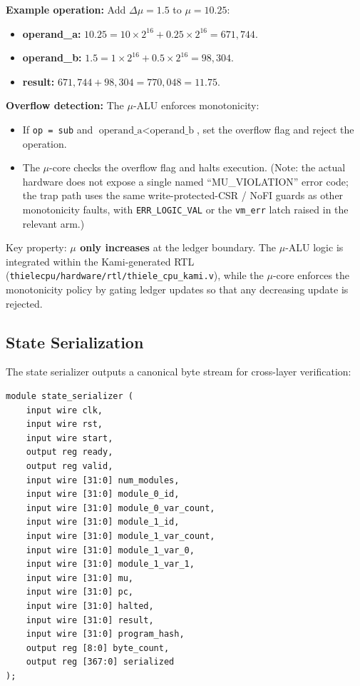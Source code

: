 \textbf{Example operation:} Add $\Delta\mu = 1.5$ to $\mu = 10.25$:
\begin{itemize}
    \item \textbf{operand\_a:} $10.25 = 10 \times 2^{16} + 0.25 \times 2^{16} = 671,744$.
    \item \textbf{operand\_b:} $1.5 = 1 \times 2^{16} + 0.5 \times 2^{16} = 98,304$.
    \item \textbf{result:} $671,744 + 98,304 = 770,048 = 11.75$.
\end{itemize}

\textbf{Overflow detection:} The $\mu$-ALU enforces monotonicity:
\begin{itemize}
    \item If \texttt{op = sub} and $\text{operand\_a} < \text{operand\_b}$, set the overflow flag and reject the operation.
    \item The $\mu$-core checks the overflow flag and halts execution. (Note: the actual hardware does not expose a single named ``MU\_VIOLATION'' error code; the trap path uses the same write-protected-CSR / NoFI guards as other monotonicity faults, with \texttt{ERR\_LOGIC\_VAL} or the \texttt{vm\_err} latch raised in the relevant arm.)
\end{itemize}


Key property: \textbf{$\mu$ only increases} at the ledger boundary. The $\mu$-ALU logic is integrated within the Kami-generated RTL (\texttt{thielecpu/hardware/rtl/thiele\_cpu\_kami.v}), while the $\mu$-core enforces the monotonicity policy by gating ledger updates so that any decreasing update is rejected.

\subsection{State Serialization}

The state serializer outputs a canonical byte stream for cross-layer verification:
\begin{lstlisting}
module state_serializer (
    input wire clk,
    input wire rst,
    input wire start,
    output reg ready,
    output reg valid,
    input wire [31:0] num_modules,
    input wire [31:0] module_0_id,
    input wire [31:0] module_0_var_count,
    input wire [31:0] module_1_id,
    input wire [31:0] module_1_var_count,
    input wire [31:0] module_1_var_0,
    input wire [31:0] module_1_var_1,
    input wire [31:0] mu,
    input wire [31:0] pc,
    input wire [31:0] halted,
    input wire [31:0] result,
    input wire [31:0] program_hash,
    output reg [8:0] byte_count,
    output reg [367:0] serialized
);
\end{lstlisting}

